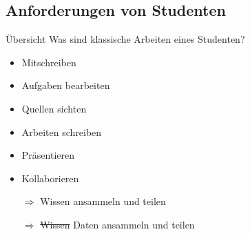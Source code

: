\subsection{Anforderungen von Studenten}
\begin{frame}{Übersicht}
Was sind klassische Arbeiten eines Studenten?
    \begin{itemize}
        \item Mitschreiben 
        \item Aufgaben bearbeiten
        \item Quellen sichten
        \item Arbeiten schreiben
        \item Präsentieren
        \item Kollaborieren\pause
        \item[$\Rightarrow$] Wissen ansammeln und teilen  \pause
        \item[$\Rightarrow$] \sout{Wissen} Daten ansammeln und teilen   
    \end{itemize}
\end{frame}

